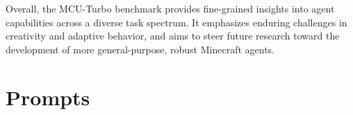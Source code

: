 Overall, the MCU-Turbo benchmark provides fine-grained insights into agent capabilities across a diverse task spectrum. It emphasizes enduring challenges in creativity and adaptive behavior, and aims to steer future research toward the development of more general-purpose, robust Minecraft agents.















\renewenvironment{shaded}{%
  \def\FrameCommand{\colorbox{lightgray}}%
  \MakeFramed {\advance\hsize-\width \FrameRestore}}%
 {\endMakeFramed}

\newpage  %


\section{Prompts}
\UseRawInputEncoding
